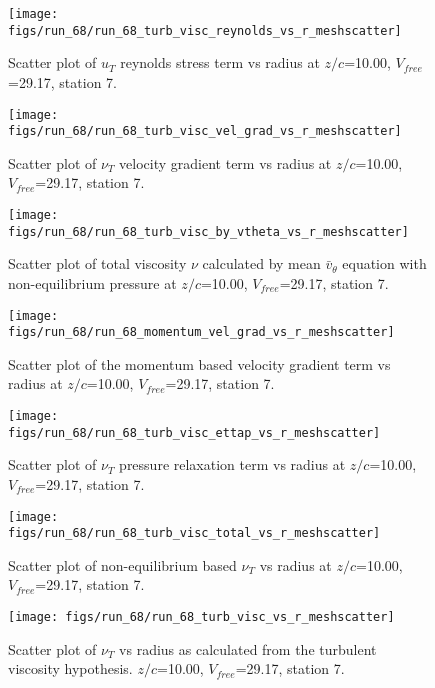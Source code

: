 \begin{figure}[H]
\centering
\texttt{[image: figs/run\_68/run\_68\_turb\_visc\_reynolds\_vs\_r\_meshscatter]}
\caption{Scatter plot of $
u_T$ reynolds stress term vs radius at $z/c$=10.00, $V_{free}$=29.17, station 7.}
\end{figure}


\begin{figure}[H]
\centering
\texttt{[image: figs/run\_68/run\_68\_turb\_visc\_vel\_grad\_vs\_r\_meshscatter]}
\caption{Scatter plot of $\nu_T$ velocity gradient term vs radius at $z/c$=10.00, $V_{free}$=29.17, station 7.}
\end{figure}


\begin{figure}[H]
\centering
\texttt{[image: figs/run\_68/run\_68\_turb\_visc\_by\_vtheta\_vs\_r\_meshscatter]}
\caption{Scatter plot of total viscosity $\nu$ calculated by mean $\bar{v}_{\theta}$ equation with non-equilibrium pressure at $z/c$=10.00, $V_{free}$=29.17, station 7.}
\end{figure}


\begin{figure}[H]
\centering
\texttt{[image: figs/run\_68/run\_68\_momentum\_vel\_grad\_vs\_r\_meshscatter]}
\caption{Scatter plot of the momentum based velocity gradient term vs radius at $z/c$=10.00, $V_{free}$=29.17, station 7.}
\end{figure}


\begin{figure}[H]
\centering
\texttt{[image: figs/run\_68/run\_68\_turb\_visc\_ettap\_vs\_r\_meshscatter]}
\caption{Scatter plot of $\nu_T$ pressure relaxation term vs radius at $z/c$=10.00, $V_{free}$=29.17, station 7.}
\end{figure}


\begin{figure}[H]
\centering
\texttt{[image: figs/run\_68/run\_68\_turb\_visc\_total\_vs\_r\_meshscatter]}
\caption{Scatter plot of non-equilibrium based $\nu_T$ vs radius at $z/c$=10.00, $V_{free}$=29.17, station 7.}
\end{figure}


\begin{figure}[H]
\centering
\texttt{[image: figs/run\_68/run\_68\_turb\_visc\_vs\_r\_meshscatter]}
\caption{Scatter plot of $\nu_T$ vs radius as calculated from the turbulent viscosity hypothesis. $z/c$=10.00, $V_{free}$=29.17, station 7.}
\end{figure}



